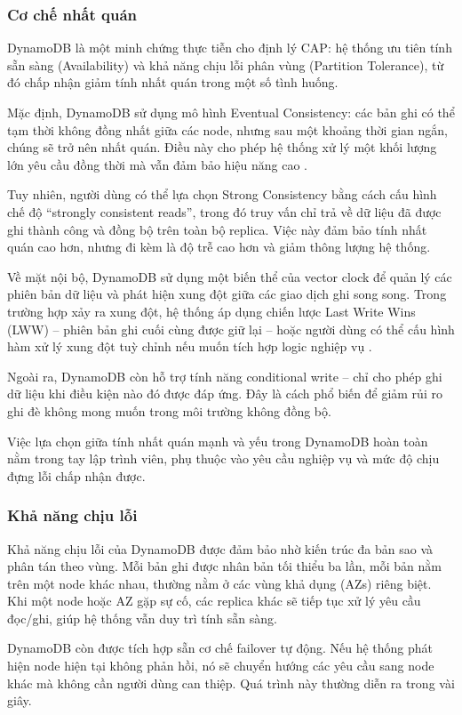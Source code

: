 \documentclass[conference]{IEEEtran}
\begin{document}
\subsubsection{Cơ chế nhất quán}
DynamoDB là một minh chứng thực tiễn cho định lý CAP: hệ thống ưu tiên tính sẵn sàng (Availability) và khả năng chịu lỗi phân vùng (Partition Tolerance), từ đó chấp nhận giảm tính nhất quán trong một số tình huống.

Mặc định, DynamoDB sử dụng mô hình Eventual Consistency: các bản ghi có thể tạm thời không đồng nhất giữa các node, nhưng sau một khoảng thời gian ngắn, chúng sẽ trở nên nhất quán. Điều này cho phép hệ thống xử lý một khối lượng lớn yêu cầu đồng thời mà vẫn đảm bảo hiệu năng cao \cite{aws}.

Tuy nhiên, người dùng có thể lựa chọn Strong Consistency bằng cách cấu hình chế độ “strongly consistent reads”, trong đó truy vấn chỉ trả về dữ liệu đã được ghi thành công và đồng bộ trên toàn bộ replica. Việc này đảm bảo tính nhất quán cao hơn, nhưng đi kèm là độ trễ cao hơn và giảm thông lượng hệ thống.

Về mặt nội bộ, DynamoDB sử dụng một biến thể của vector clock để quản lý các phiên bản dữ liệu và phát hiện xung đột giữa các giao dịch ghi song song. Trong trường hợp xảy ra xung đột, hệ thống áp dụng chiến lược Last Write Wins (LWW) – phiên bản ghi cuối cùng được giữ lại – hoặc người dùng có thể cấu hình hàm xử lý xung đột tuỳ chỉnh nếu muốn tích hợp logic nghiệp vụ \cite{aws}.

Ngoài ra, DynamoDB còn hỗ trợ tính năng conditional write – chỉ cho phép ghi dữ liệu khi điều kiện nào đó được đáp ứng. Đây là cách phổ biến để giảm rủi ro ghi đè không mong muốn trong môi trường không đồng bộ.

Việc lựa chọn giữa tính nhất quán mạnh và yếu trong DynamoDB hoàn toàn nằm trong tay lập trình viên, phụ thuộc vào yêu cầu nghiệp vụ và mức độ chịu đựng lỗi chấp nhận được.
\subsubsection{Khả năng chịu lỗi}
Khả năng chịu lỗi của DynamoDB được đảm bảo nhờ kiến trúc đa bản sao và phân tán theo vùng. Mỗi bản ghi được nhân bản tối thiểu ba lần, mỗi bản nằm trên một node khác nhau, thường nằm ở các vùng khả dụng (AZs) riêng biệt. Khi một node hoặc AZ gặp sự cố, các replica khác sẽ tiếp tục xử lý yêu cầu đọc/ghi, giúp hệ thống vẫn duy trì tính sẵn sàng.

DynamoDB còn được tích hợp sẵn cơ chế failover tự động. Nếu hệ thống phát hiện node hiện tại không phản hồi, nó sẽ chuyển hướng các yêu cầu sang node khác mà không cần người dùng can thiệp. Quá trình này thường diễn ra trong vài giây.
\end{document}
